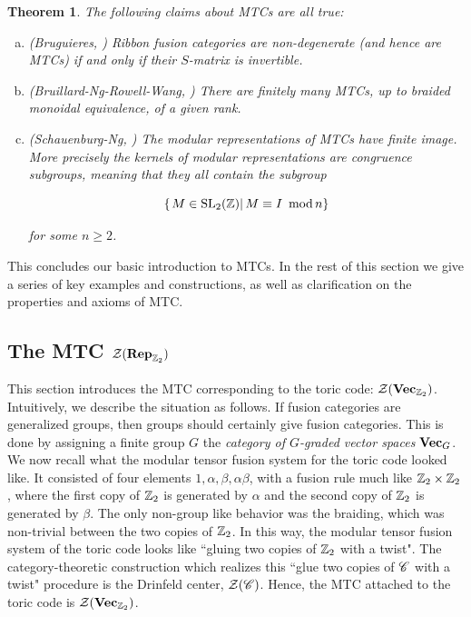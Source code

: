 \documentclass{article}
\newtheorem{theorem}{Theorem}[section]
\theoremstyle{definition}
\numberwithin{figure}{section}
\begin{document}
\begin{theorem}\label{MTC facts} The following claims about MTCs are all true:

\begin{enumerate}[(a)]
\item (Bruguieres, \cite{bruguieres2000categories}) Ribbon fusion categories are non-degenerate (and hence are MTCs) if and only if their $S$-matrix is invertible.

\item (Bruillard-Ng-Rowell-Wang, \cite{bruillard2016rank}) There are finitely many MTCs, up to braided monoidal equivalence, of a given rank.

\item (Schauenburg-Ng, \cite{ng2010congruence}) The modular representations of MTCs have finite image. More precisely the kernels of modular representations are \textit{congruence subgroups}, meaning that they all contain the subgroup

$$\left\{ \left. M\in \mathrm{SL}_2(\mathbb{Z}) \right| M\equiv I\,\,\, \mathrm{mod}\, n\right\}$$

for some $n\geq 2$.
\end{enumerate}
\end{theorem}

This concludes our basic introduction to MTCs. In the rest of this section we give a series of key examples and constructions, as well as clarification on the properties and axioms of MTC.

\subsection{The MTC $\mathcal{Z}(\bold{Rep}_{\mathbb{Z}_2})$}
\label{VecZ2 MTC}

This section introduces the MTC corresponding to the toric code: $\mathcal{Z}(\bold{Vec}_{\mathbb{Z}_2})$. Intuitively, we describe the situation as follows. If fusion categories are generalized groups, then groups should certainly give fusion categories. This is done by assigning a finite group $G$ the \textit{category of $G$-graded vector spaces} $\bold{Vec}_G$. We now recall what the modular tensor fusion system for the toric code looked like. It consisted of four elements $1,\alpha,\beta,\alpha\beta$, with a fusion rule much like $\mathbb{Z}_2\times \mathbb{Z}_2$, where the first copy of $\mathbb{Z}_2$ is generated by $\alpha$ and the second copy of $\mathbb{Z}_2$ is generated by $\beta$. The only non-group like behavior was the braiding, which was non-trivial between the two copies of $\mathbb{Z}_2$. In this way, the modular tensor fusion system of the toric code looks like ``gluing two copies of $\mathbb{Z}_2$ with a twist". The category-theoretic construction which realizes this ``glue two copies of $\mathscr{C}$ with a twist" procedure is the Drinfeld center, $\mathcal{Z}(\mathscr{C})$. Hence, the MTC attached to the toric code is $\mathcal{Z}(\bold{Vec}_{\mathbb{Z}_2})$.
\end{document}
